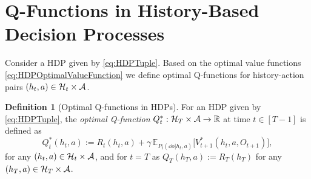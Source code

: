 \documentclass[
    a4paper,
    11pt,
    bibliography=totoc,
    listof=totoc,      
    headinclude=true,
    cleardoublepage=empty,
]{scrbook}
\theoremstyle{plain}
\theoremstyle{definition}
\newtheorem{definition}[theorem]{Definition}
\theoremstyle{remark}
\newcommand{\SetR}{\mathbb R}
\newcommand{\E}{\mathbb E}
\newcommand{\SpaceA}{{\cal A}}
\newcommand{\SpaceH}{{\cal H}}
\begin{document}
\section{Q-Functions in History-Based Decision Processes}
\label{chapter:SignatureQLearning:section:QFunctionsInHDP}

Consider a HDP given by \cref{eq:HDPTuple}. Based on the optimal value 
functions \eqref{eq:HDPOptimalValueFunction} we define optimal 
Q-functions for history-action pairs $(h_t,a)\in\SpaceH_t \times \SpaceA$.

\begin{definition}[Optimal Q-functions in HDPs]
\label{def:HDPQFunctions}
    For an HDP given by \cref{eq:HDPTuple}, the \textit{optimal Q-function} 
    $Q^*_t:\SpaceH_T\times\SpaceA\to\SetR$ at time $t\in[T-1]$ is defined as 
    \begin{equation}
    \label{eq:HDPOptimalQFunction}
        Q_t^*(h_t,a) 
        := R_t(h_t,a) + \gamma\, \E_{P_t(\dd{o}|h_t,a)}\bigl[
            V^*_{t+1}(h_t, a, O_{t+1})
        \bigr], 
    \end{equation}
    for any $(h_t,a)\in\SpaceH_t\times\SpaceA$, and for $t=T$ as $Q_T(h_T,a)
    := R_T(h_T)$ for any $(h_T,a)\in\SpaceH_T\times\SpaceA$.
\end{definition}
\end{document}
